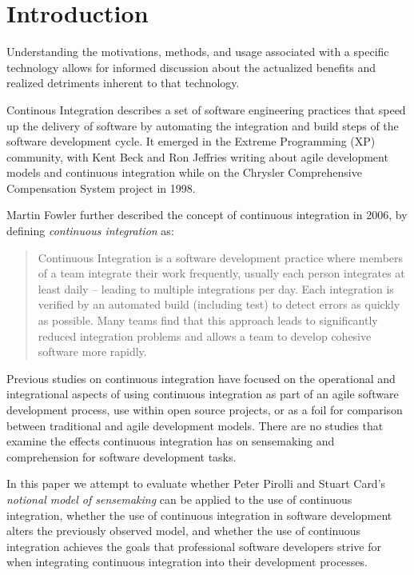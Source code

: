 \documentclass{sig-alternate}
\begin{document}


\section{Introduction}
Understanding the motivations, methods, and usage associated with a specific technology allows for informed discussion about the actualized benefits and realized detriments inherent to that technology.

Continous Integration describes a set of software engineering practices that speed up the delivery of software by automating the integration and build steps of the software development cycle. It emerged in the Extreme Programming (XP) community, with Kent Beck and Ron Jeffries writing about agile development models and continuous integration while on the Chrysler Comprehensive Compensation System project in 1998\cite{beck:extreme_programming}\cite{beck:agile_manifesto}.

Martin Fowler further described the concept of continuous integration in 2006, by defining \textit{continuous integration} as:
\begin{quote}
Continuous Integration is a software development practice where members of a team integrate their work frequently, usually each person integrates at least daily -- leading to multiple integrations per day. Each integration is verified by an automated build (including test) to detect errors as quickly as possible. Many teams find that this approach leads to significantly reduced integration problems and allows a team to develop cohesive software more rapidly.\cite{fowler:continuous}
\end{quote}

Previous studies on continuous integration have focused on the operational and integrational aspects of using continuous integration as part of an agile software development process\cite{miller:hundreddays}\cite{olsson:climbingstairway}, use within open source projects\cite{deshpande:ci_opensource}, or as a foil for comparison between traditional and agile development models\cite{staahl:modelingdiffs}. There are no studies that examine the effects continuous integration has on sensemaking and comprehension for software development tasks.

In this paper we attempt to evaluate whether Peter Pirolli and Stuart Card's \textit{notional model of sensemaking}\cite{pirolli:sensemaking} can be applied to the use of continuous integration, whether the use of continuous integration in software development alters the previously observed model, and whether the use of continuous integration achieves the goals that professional software developers strive for when integrating continuous integration into their development processes.
\end{document}
